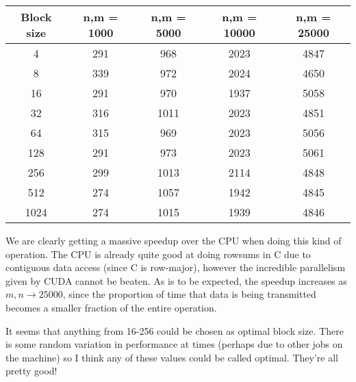 \documentclass[a4paper, fleqn]{article}
\begin{document}
        \begin{center}
 \begin{tabular}{||c | c | c | c | c ||}
 \hline
 Block size & n,m = 1000 & n,m = 5000 & n,m = 10000 & n,m = 25000 \\ [0.5ex] 
 \hline
 4 & 291 & 968 & 2023 & 4847 \\
 \hline
 8 & 339 & 972 & 2024 & 4650 \\
 \hline
 16 & 291 & 970 & 1937 & 5058 \\
 \hline
 32 & 316 & 1011 & 2023 & 4851 \\
 \hline
 64 & 315 & 969 & 2023 & 5056 \\
 \hline
 128 & 291 & 973 & 2023 & 5061 \\
 \hline
 256 & 299 & 1013 & 2114 & 4848 \\
 \hline
 512 & 274 & 1057 & 1942 & 4845 \\
 \hline
 1024 & 274 & 1015 & 1939 & 4846 \\
 \hline

 \hline
\end{tabular}
\end{center}
We are clearly getting a massive speedup over the CPU when doing this kind of operation. The CPU is already quite good at doing rowsums in C due to contiguous data access (since C is row-major), however the incredible parallelism given by CUDA cannot be beaten. As is to be expected, the speedup increases as $m,n \to 25000$, since the proportion of time that data is being transmitted becomes a smaller fraction of the entire operation.

It seems that anything from 16-256 could be chosen as optimal block size. There is some random variation in performance at times (perhaps due to other jobs on the machine) so I think any of these values could be called optimal. They're all pretty good!
\pagebreak
\end{document}
